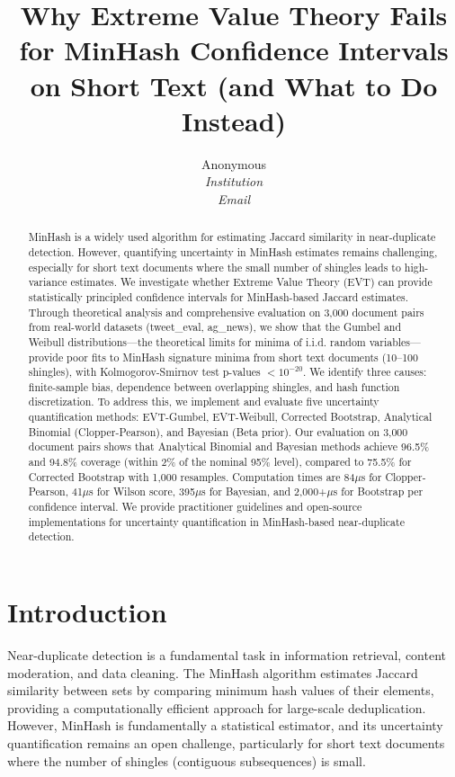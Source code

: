 \documentclass[11pt,letterpaper]{article}
\title{Why Extreme Value Theory Fails for MinHash Confidence Intervals on Short Text (and What to Do Instead)}
\author{Anonymous\\
\textit{Institution}\\
\textit{Email}
}
\date{}
\begin{document}
\maketitle

\begin{abstract}
MinHash is a widely used algorithm for estimating Jaccard similarity in near-duplicate detection. However, quantifying uncertainty in MinHash estimates remains challenging, especially for short text documents where the small number of shingles leads to high-variance estimates. We investigate whether Extreme Value Theory (EVT) can provide statistically principled confidence intervals for MinHash-based Jaccard estimates. Through theoretical analysis and comprehensive evaluation on 3,000 document pairs from real-world datasets (tweet\_eval, ag\_news), we show that the Gumbel and Weibull distributions---the theoretical limits for minima of i.i.d. random variables---provide poor fits to MinHash signature minima from short text documents (10--100 shingles), with Kolmogorov-Smirnov test p-values $< 10^{-20}$. We identify three causes: finite-sample bias, dependence between overlapping shingles, and hash function discretization. To address this, we implement and evaluate five uncertainty quantification methods: EVT-Gumbel, EVT-Weibull, Corrected Bootstrap, Analytical Binomial (Clopper-Pearson), and Bayesian (Beta prior). Our evaluation on 3,000 document pairs shows that Analytical Binomial and Bayesian methods achieve 96.5\% and 94.8\% coverage (within 2\% of the nominal 95\% level), compared to 75.5\% for Corrected Bootstrap with 1,000 resamples. Computation times are 84$\mu$s for Clopper-Pearson, 41$\mu$s for Wilson score, 395$\mu$s for Bayesian, and 2,000+$\mu$s for Bootstrap per confidence interval. We provide practitioner guidelines and open-source implementations for uncertainty quantification in MinHash-based near-duplicate detection.
\end{abstract}

\section{Introduction}

Near-duplicate detection is a fundamental task in information retrieval, content moderation, and data cleaning. The MinHash algorithm \cite{Broder1997} estimates Jaccard similarity between sets by comparing minimum hash values of their elements, providing a computationally efficient approach for large-scale deduplication. However, MinHash is fundamentally a statistical estimator, and its uncertainty quantification remains an open challenge, particularly for short text documents where the number of shingles (contiguous subsequences) is small.
\end{document}
